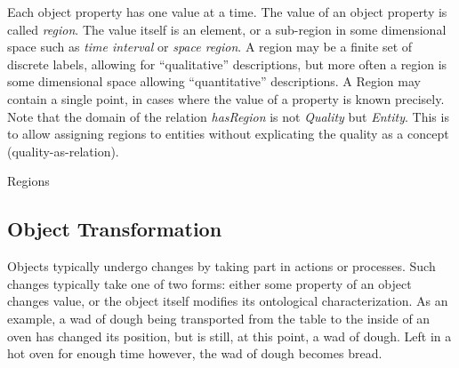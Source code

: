Each object property has one value at a time. The value of an object property is called \emph{region}.
The value itself is an element, or a sub-region in some dimensional
space such as \emph{time interval} or \emph{space region}.
A region may be a finite set of discrete labels, allowing for ``qualitative'' descriptions,
but more often a region is some dimensional space allowing ``quantitative'' descriptions.
A Region may contain a single point, in cases where the value of a property is known precisely.
Note that the domain of the relation \emph{hasRegion} is not \emph{Quality} but \emph{Entity}.
This is to allow assigning regions to entities without explicating the quality as a concept (quality-as-relation).

\begin{ODP}{Regions}
\end{ODP}

\subsection{Object Transformation}
\label{sec:transformation}

Objects typically undergo changes by taking part in actions or processes. Such changes typically take one of two forms: either some property of an object changes value, or the object itself modifies its ontological characterization. As an example, a wad of dough being transported from the table to the inside of an oven has changed its position, but is still, at this point, a wad of dough. Left in a hot oven for enough time however, the wad of dough becomes bread.


